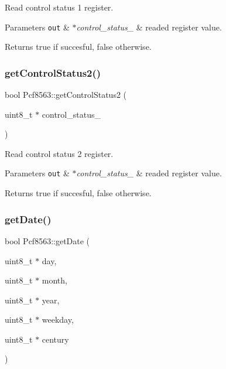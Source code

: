 Read control status 1 register. 


\begin{DoxyParams}[1]{Parameters}
\mbox{\tt out}  & {\em $\ast$control\+\_\+status\+\_} & readed register value. \\
\hline
\end{DoxyParams}
\begin{DoxyReturn}{Returns}
true if succesful, false otherwise. 
\end{DoxyReturn}
\mbox{\label{namespacePcf8563_a6cf47400c4e974b9d9a1bf1d1a9e463d}} 
\subsubsection{\texorpdfstring{get\+Control\+Status2()}{getControlStatus2()}}
{\footnotesize\ttfamily bool Pcf8563\+::get\+Control\+Status2 (\begin{DoxyParamCaption}\item[{uint8\+\_\+t $\ast$}]{control\+\_\+status\+\_ }\end{DoxyParamCaption})}



Read control status 2 register. 


\begin{DoxyParams}[1]{Parameters}
\mbox{\tt out}  & {\em $\ast$control\+\_\+status\+\_} & readed register value. \\
\hline
\end{DoxyParams}
\begin{DoxyReturn}{Returns}
true if succesful, false otherwise. 
\end{DoxyReturn}
\mbox{\label{namespacePcf8563_aa852ae63d80f0a9137b3910a3b193d89}} 
\subsubsection{\texorpdfstring{get\+Date()}{getDate()}}
{\footnotesize\ttfamily bool Pcf8563\+::get\+Date (\begin{DoxyParamCaption}\item[{uint8\+\_\+t $\ast$}]{day,  }\item[{uint8\+\_\+t $\ast$}]{month,  }\item[{uint8\+\_\+t $\ast$}]{year,  }\item[{uint8\+\_\+t $\ast$}]{weekday,  }\item[{uint8\+\_\+t $\ast$}]{century }\end{DoxyParamCaption})}



